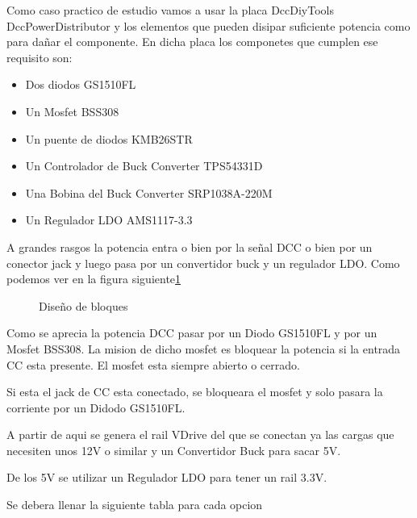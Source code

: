 
Como caso practico de estudio vamos a usar la placa DccDiyTools DccPowerDistributor y los elementos que
pueden disipar suficiente potencia como para dañar el componente. En dicha placa los 
componetes que cumplen ese requisito son:
\begin{itemize}
    \item Dos diodos GS1510FL
    \item Un Mosfet BSS308
    \item Un puente de diodos KMB26STR
    \item Un Controlador de Buck Converter TPS54331D
    \item Una Bobina del Buck Converter SRP1038A-220M
    \item Un Regulador LDO AMS1117-3.3
\end{itemize}
A grandes rasgos la potencia entra o bien por la señal DCC o bien por un conector jack y luego pasa por un convertidor buck y un regulador LDO. Como podemos ver en la figura siguiente\ref{fig:Bloques}
\begin{figure}[H]
    \centering
    
    \caption{Diseño de bloques}
    \label{fig:Bloques}
\end{figure}

Como se aprecia la potencia DCC pasar por un Diodo GS1510FL y por un Mosfet BSS308. La mision de dicho mosfet es bloquear la potencia si la entrada CC esta presente. El mosfet esta siempre abierto o cerrado.

Si esta el jack de CC esta conectado, se bloqueara el mosfet y solo pasara la corriente por un Didodo GS1510FL.

A partir de aqui se genera el rail VDrive del que se conectan ya las cargas que necesiten unos 12V o similar y un Convertidor Buck para sacar 5V.

De los 5V se utilizar un Regulador LDO para tener un rail 3.3V.

Se debera llenar la siguiente tabla para cada opcion

